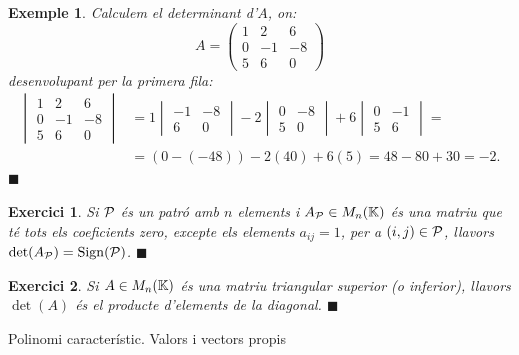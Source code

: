 \documentclass[
  11pt,
]{book}
\makeatletter
\numberwithin{dummy}{section}
\theoremstyle{maincolornumbox}
\newtheorem{exerciseT}{Exercici}[chapter]
\theoremstyle{blacknumex}
\newtheorem{exampleT}{Exemple}[chapter]
\theoremstyle{blacknumbox}
\theoremstyle{maincolornum}
\newenvironment{exercise}{\begin{eBox}\begin{exerciseT}}{\hfill{\color{maincolor}\tiny\ensuremath{\blacksquare}}\end{exerciseT}\end{eBox}}
\newenvironment{example}{\begin{exampleT}}{\hfill{\tiny\ensuremath{\blacksquare}}\end{exampleT}}
\renewcommand{\section}{\@startsection{section}{1}{\z@}
{-4ex \@plus -1ex \@minus -.4ex}
{1ex \@plus.2ex }
{\normalfont\large\sffamily\bfseries}}
\makeatother
\begin{document}
\begin{example}
Calculem el determinant d'\(A\), on:\[A=\begin{pmatrix}
    1 & 2 & 6 \\ 0 & -1 & -8 \\ 5 & 6 & 0
    \end{pmatrix}\] desenvolupant per la primera fila: \begin{align*}
    \begin{vmatrix}
    1 & 2 & 6 \\ 0 & -1 & -8 \\ 5 & 6 & 0
    \end{vmatrix} & = 1 \begin{vmatrix} -1 & -8 \\ 6 & 0 \end{vmatrix} 
    -2 \begin{vmatrix} 0 & -8 \\ 5 & 0  \end{vmatrix} +
    6 \begin{vmatrix} 0 & -1 \\ 5 & 6  \end{vmatrix} = \\
     & = (0-(-48))-2(40)+6(5)=48-80+30=-2.
\end{align*}
\end{example}

\begin{exercise}
Si \(\mathcal{P}\) és un patró amb \(n\) elements i \(A_{\mathcal{P}}\in M_n(\mathbb{K})\) és una
matriu que té tots els coeficients zero, excepte els elements
\(a_{ij}=1\), per a \((i,j)\in\mathcal{P}\), llavors \(\det(A_{\mathcal{P}})=\operatorname{Sign}(\mathcal{P})\).
\end{exercise}

\begin{exercise}
Si \(A\in M_n(\mathbb{K})\) és una matriu triangular superior (o inferior),
llavors \(\det(A)\) és el producte d'elements de la diagonal.
\end{exercise}

\hypertarget{polinomi-caracteruxedstic.-valors-i-vectors-propis}{%
\section{Polinomi característic. Valors i vectors propis}\label{polinomi-caracteruxedstic.-valors-i-vectors-propis}}
\end{document}
